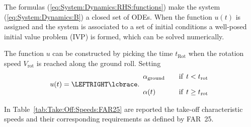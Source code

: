 \documentclass[12pt,twoside]{book}
\begin{document}
The formulas (\ref{eq:System:Dynamics:RHS:functions}) make the system (\ref{eq:System:Dynamics:B})
a closed set of ODEs.
When the function $u(t)$ is assigned and the system is associated to a set of initial conditions a well-posed
initial value problem (IVP) is formed, which can be solved numerically.

The function $u$ can be constructed by picking the time $t_{\text{Rot}}$ when the rotation speed $V_{\text{rot}}$ 
is reached along the ground roll. Setting
\begin{equation}\label{eq:System:Dynamics:Alpha:Law}
u (t) =
    \LEFTRIGHT\lcbrace.{
      \begin{array}{l@{\rule{2em}{0pt}}l} 
        \alpha_{\text{ground}}
          & \text{if} \;\, t < t_{\text{rot}}
        \\[1em]
        \alpha(t)
          & \text{if} \;\, t \geq t_{\text{rot}}
      \end{array}
    }  
\end{equation}

In Table~\ref{tab:Take:Off:Speeds:FAR25} are reported the take-off characteristic speeds and their
corresponding requirements as defined by FAR~25.
\end{document}
